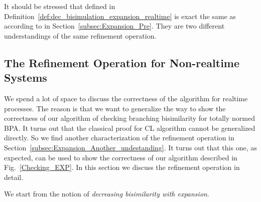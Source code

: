 \documentclass{llncs}
\begin{document}
It should be stressed that  defined in Definition~\ref{def:dec_bisimulation_expansion_realtime} is exact the same as  according to  in Section~\ref{subsec:Expansion_Pre}.  They are two different understandings of the same refinement operation.


\subsection{The Refinement Operation for Non-realtime Systems}\label{subsec:Expansion_in_general}

We spend a lot of space to discuss the correctness of the algorithm for realtime processes. The reason is that we want to generalize the way to show the correctness of our algorithm of checking branching bisimilarity for totally normed BPA. It turns out that the classical proof for CL algorithm cannot be generalized directly.  So we find another characterization of the refinement operation in Section~\ref{subsec:Expansion_Another_undestanding}.  It turns out that this one, as expected, can be used to show the correctness of our algorithm described in Fig.~\ref{Checking_EXP}.  In this section  we discuss the refinement operation in detail.

We start from the notion of {\em decreasing bisimilarity with expansion}.
\end{document}
